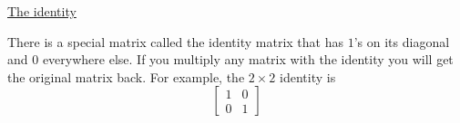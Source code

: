 \documentclass[reqno]{amsart}
\theoremstyle{definition}
\begin{document}
\bigskip

\underline{The identity}

There is a special matrix called the identity matrix that has $1$'s on its diagonal and $0$ everywhere else.  If you multiply any matrix with the identity you will get the original matrix back.  For example, the $2\times 2$ identity is
%
\begin{equation*}
\begin{bmatrix}
1 & 0\\
0 & 1
\end{bmatrix}
\end{equation*}
\end{document}
